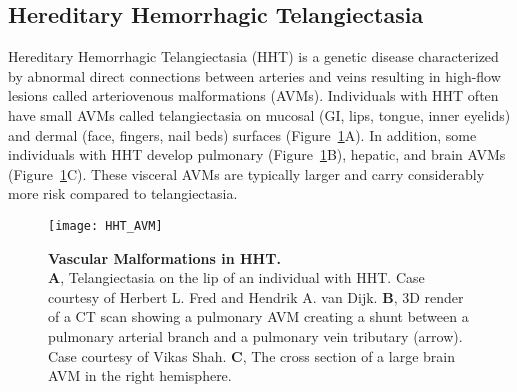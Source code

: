 \subsection{Hereditary Hemorrhagic Telangiectasia}
Hereditary Hemorrhagic Telangiectasia (HHT) is a genetic disease characterized by abnormal direct connections between arteries and veins resulting in high-flow lesions called arteriovenous malformations (AVMs). Individuals with HHT often have small AVMs called telangiectasia on mucosal (GI, lips, tongue, inner eyelids) and dermal (face, fingers, nail beds) surfaces (Figure~\ref{HHT_AVM}A). In addition, some individuals with HHT develop pulmonary (Figure~\ref{HHT_AVM}B), hepatic, and brain AVMs (Figure~\ref{HHT_AVM}C). These visceral AVMs are typically larger and carry considerably more risk compared to telangiectasia. 

\begin{figure}[bp!]
\begin{center}
\texttt{[image: HHT\_AVM]}
\end{center}
\caption[Vascular Malformations in HHT.] {\textbf{Vascular Malformations in HHT.} \\ \textbf{A}, Telangiectasia on the lip of an individual with HHT. Case courtesy of Herbert L. Fred and Hendrik A. van Dijk. \textbf{B}, 3D render of a CT scan showing a pulmonary AVM creating a shunt between a pulmonary arterial branch and a pulmonary vein tributary (arrow). Case courtesy of Vikas Shah. \textbf{C}, The cross section of a large brain AVM in the right hemisphere.}

\label{HHT_AVM}
\end{figure}

